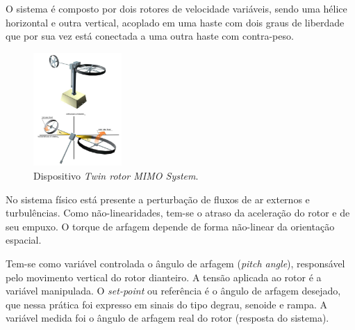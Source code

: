 O sistema é composto por dois rotores de velocidade variáveis, sendo uma hélice 
horizontal e outra vertical, acoplado em uma haste com dois graus de liberdade que
 por sua vez está conectada a uma outra haste com contra-peso.


\begin{figure}[H]
    \centering
    \includegraphics[width=0.30\textwidth]{figures/twin_rotor.PNG}
    \caption{Dispositivo \textit{Twin rotor MIMO System}.}
    \label{fig:TwinRotor}
\end{figure}

No sistema físico está presente a perturbação de fluxos de ar externos e turbulências. Como não-linearidades, tem-se o atraso da aceleração do rotor e de seu empuxo. O torque de arfagem depende de forma não-linear da orientação espacial.

Tem-se como variável controlada o ângulo de arfagem (\textit{pitch angle}), responsável pelo movimento vertical do rotor dianteiro. A tensão aplicada ao rotor é a variável manipulada. O \textit{set-point} ou referência é o ângulo de arfagem desejado, que nessa prática foi expresso em sinais do tipo degrau, senoide e rampa. A variável medida foi o ângulo de arfagem real do rotor (resposta do sistema).

